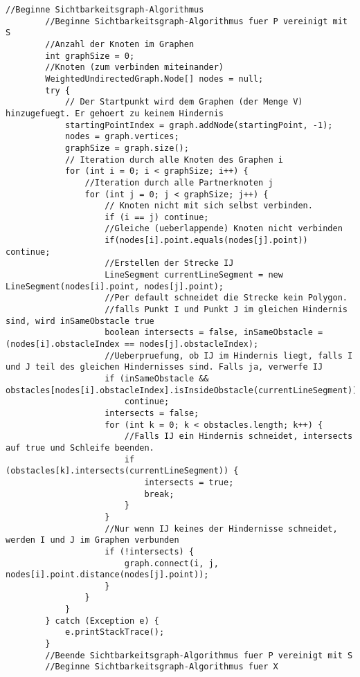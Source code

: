 \documentclass[a4paper,10pt,ngerman]{scrartcl}
\begin{document}
\begin{lstlisting}[frame=single]
        //Beginne Sichtbarkeitsgraph-Algorithmus
        //Beginne Sichtbarkeitsgraph-Algorithmus fuer P vereinigt mit S
        //Anzahl der Knoten im Graphen
        int graphSize = 0;
        //Knoten (zum verbinden miteinander)
        WeightedUndirectedGraph.Node[] nodes = null;
        try {
            // Der Startpunkt wird dem Graphen (der Menge V) hinzugefuegt. Er gehoert zu keinem Hindernis
            startingPointIndex = graph.addNode(startingPoint, -1);
            nodes = graph.vertices;
            graphSize = graph.size();
            // Iteration durch alle Knoten des Graphen i
            for (int i = 0; i < graphSize; i++) {
                //Iteration durch alle Partnerknoten j
                for (int j = 0; j < graphSize; j++) {
                    // Knoten nicht mit sich selbst verbinden.
                    if (i == j) continue;
                    //Gleiche (ueberlappende) Knoten nicht verbinden
                    if(nodes[i].point.equals(nodes[j].point)) continue;
                    //Erstellen der Strecke IJ
                    LineSegment currentLineSegment = new LineSegment(nodes[i].point, nodes[j].point);
                    //Per default schneidet die Strecke kein Polygon.
                    //falls Punkt I und Punkt J im gleichen Hindernis sind, wird inSameObstacle true
                    boolean intersects = false, inSameObstacle = (nodes[i].obstacleIndex == nodes[j].obstacleIndex);
                    //Ueberpruefung, ob IJ im Hindernis liegt, falls I und J teil des gleichen Hindernisses sind. Falls ja, verwerfe IJ
                    if (inSameObstacle && obstacles[nodes[i].obstacleIndex].isInsideObstacle(currentLineSegment))
                        continue;
                    intersects = false;
                    for (int k = 0; k < obstacles.length; k++) {
                        //Falls IJ ein Hindernis schneidet, intersects auf true und Schleife beenden.
                        if (obstacles[k].intersects(currentLineSegment)) {
                            intersects = true;
                            break;
                        }
                    }
                    //Nur wenn IJ keines der Hindernisse schneidet, werden I und J im Graphen verbunden
                    if (!intersects) {
                        graph.connect(i, j, nodes[i].point.distance(nodes[j].point));
                    }
                }
            }
        } catch (Exception e) {
            e.printStackTrace();
        }
        //Beende Sichtbarkeitsgraph-Algorithmus fuer P vereinigt mit S
        //Beginne Sichtbarkeitsgraph-Algorithmus fuer X


\end{lstlisting}
\end{document}
